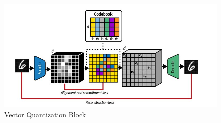\documentclass[twoside,english,notitlepage]{report}
\begin{document}
\begin{figure}[h]
    \centering
    \includegraphics[width=\textwidth]{task2/vq-block.jpg}
    \caption{Vector Quantization Block}
    \label{fig:vq-concept}
\end{figure}
\end{document}
